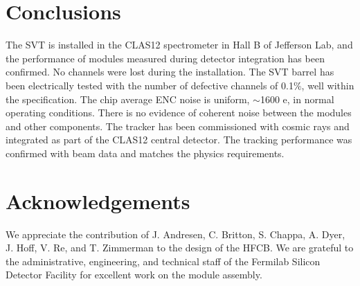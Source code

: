 \section{Conclusions}

The SVT is installed in the CLAS12 spectrometer in Hall B of Jefferson Lab, and the performance of modules measured during detector integration has been confirmed. No channels were lost during the installation. The SVT barrel has been electrically  tested with the number of defective channels of 0.1$\%$, well within the specification. The chip average ENC noise is uniform, $\sim$1600 e, in normal operating conditions. There is no evidence of coherent noise between the modules and other components. The tracker has been commissioned with cosmic rays and integrated as part of the CLAS12 central detector. The tracking performance was confirmed with beam data and matches the physics requirements. 

\section{Acknowledgements}

We appreciate the contribution of J.  Andresen, C. Britton, S. Chappa, A. Dyer, J. Hoff, V. Re, and T. Zimmerman to the design of the HFCB. We are grateful to the administrative, engineering, and technical staff of the Fermilab Silicon Detector Facility for excellent work on the module assembly.



